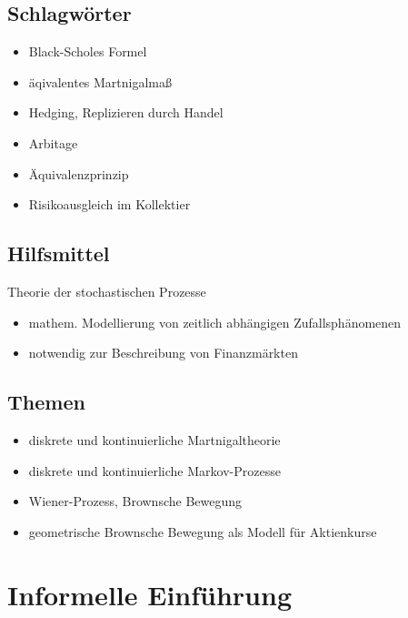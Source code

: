 \subsection*{Schlagwörter} %
\label{sub: schlagwörter}

\begin{itemize}
	\item Black-Scholes Formel
	\item äqivalentes Martnigalmaß
	\item Hedging, Replizieren durch Handel
	\item Arbitage
	\item Äquivalenzprinzip
	\item Risikoausgleich im Kollektier
\end{itemize}

\subsection*{Hilfsmittel} %
\label{sub:hilfsmittel}

Theorie der stochastischen Prozesse
\begin{itemize}
	\item mathem. Modellierung von zeitlich abhängigen Zufallsphänomenen
	\item notwendig zur Beschreibung von Finanzmärkten
\end{itemize}

\subsection*{Themen} %
\label{sub: themen}

\begin{itemize}
	\item diskrete und kontinuierliche Martnigaltheorie
	\item diskrete und kontinuierliche Markov-Prozesse
	\item Wiener-Prozess, Brownsche Bewegung
	\item geometrische Brownsche Bewegung als Modell für Aktienkurse
\end{itemize}


\newpage

\section{Informelle Einführung} %
\label{sec: informelle_einführung}

